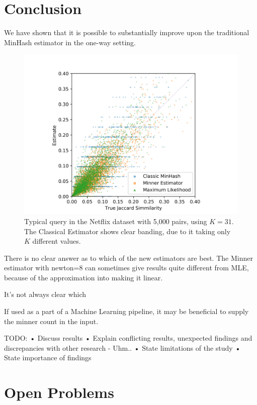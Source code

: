 
\section{Conclusion}

We have shown that it is possible to substantially improve upon the traditional MinHash estimator in the one-way setting.

\begin{figure}
   \centering
   \includegraphics[trim=10 0 10 30,clip,width=\linewidth]{figures/scatter}
   \caption{Typical query in the Netflix dataset with 5,000 pairs, using $K=31$.
      The Classical Estimator shows clear banding, due to it taking only $K$ different values.
   }
   \label{fig:scatter}
\end{figure}

There is no clear answer as to which of the new estimators are best.
The Minner estimator with newton=8 can sometimes give results quite different from MLE, because of the approximation into making it linear.

It's not always clear which 

If used as a part of a Machine Learning pipeline, it may be beneficial to supply the minner count in the input.

TODO:
• Discuss results
• Explain conflicting results, unexpected findings and discrepancies with other research
   - Uhm..
• State limitations of the study
• State importance of findings

\section{Open Problems}


